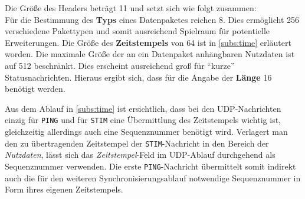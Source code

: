 Die Größe des Headers beträgt \SI{11}{\byte} und setzt sich wie folgt
zusammen:\\
Für die Bestimmung des \textbf{Typs} eines Datenpaketes reichen \SI{8}{\bit}.
Dies ermöglicht 256 verschiedene Pakettypen und somit ausreichend Spielraum für
potentielle Erweiterungen. Die Größe des \textbf{Zeitstempels} von \SI{64}{\bit}
ist in \autoref{subs:time} erläutert worden. Die maximale Größe der an ein
Datenpaket anhängbaren Nutzdaten ist auf \SI{512}{\byte} beschränkt. Dies
erscheint ausreichend groß für "`kurze"' Statusnachrichten. Hieraus ergibt sich,
dass für die Angabe der \textbf{Länge} \SI{16}{\bit} benötigt werden.


Aus dem Ablauf in \autoref{subs:time} ist ersichtlich, dass bei den
UDP-Nachrichten einzig für \texttt{PING} und für \texttt{STIM} eine
Übermittlung des Zeitstempels wichtig ist, gleichzeitig allerdings auch eine
Sequenznummer benötigt wird. Verlagert man den zu übertragenden Zeitstempel der
\texttt{STIM}-Nachricht in den Bereich der \emph{Nutzdaten}, lässt sich das
\emph{Zeitstempel}-Feld im UDP-Ablauf durchgehend als Sequenznummer verwenden.
Die erste \texttt{PING}-Nachricht übermittelt somit indirekt auch die für den
weiteren Synchronisierungsablauf notwendige Sequenznummer in Form ihres eigenen
Zeitstempels.

